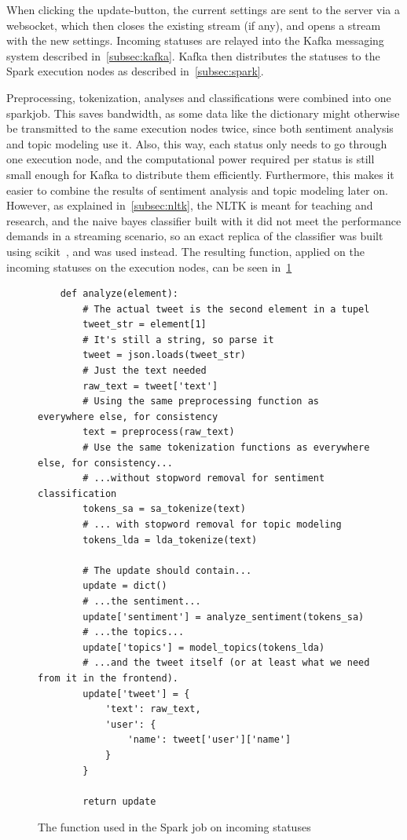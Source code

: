 When clicking the update-button, the current settings are sent to the server via a websocket,
which then closes the existing stream (if any), and opens a stream with the new settings.
Incoming statuses are relayed into the Kafka messaging system described in~\cref{subsec:kafka}.
Kafka then distributes the statuses to the Spark execution nodes as described in~\cref{subsec:spark}.

Preprocessing, tokenization, analyses and classifications were combined into one sparkjob.
This saves bandwidth, as some data like the dictionary might otherwise be transmitted to the same execution nodes twice,
since both sentiment analysis and topic modeling use it.
Also, this way, each status only needs to go through one execution node,
and the computational power required per status is still small enough for Kafka to distribute them efficiently.
Furthermore, this makes it easier to combine the results of sentiment analysis and topic modeling later on.
However, as explained in~\cref{subsec:nltk}, the NLTK is meant for teaching and research,
and the naive bayes classifier built with it did not meet the performance demands in a streaming scenario,
so an exact replica of the classifier was built using scikit~\cite{scikitDocs}, and was used instead.
The resulting function, applied on the incoming statuses on the execution nodes, can be seen in~\cref{fig:spark_job}

\begin{figure}
    \caption{The function used in the Spark job on incoming statuses}
    \label{fig:spark_job}
    \begin{verbatim}
    def analyze(element):
        # The actual tweet is the second element in a tupel
        tweet_str = element[1]
        # It's still a string, so parse it
        tweet = json.loads(tweet_str)
        # Just the text needed
        raw_text = tweet['text']
        # Using the same preprocessing function as everywhere else, for consistency
        text = preprocess(raw_text)
        # Use the same tokenization functions as everywhere else, for consistency...
        # ...without stopword removal for sentiment classification
        tokens_sa = sa_tokenize(text)
        # ... with stopword removal for topic modeling
        tokens_lda = lda_tokenize(text)

        # The update should contain...
        update = dict()
        # ...the sentiment...
        update['sentiment'] = analyze_sentiment(tokens_sa)
        # ...the topics...
        update['topics'] = model_topics(tokens_lda)
        # ...and the tweet itself (or at least what we need from it in the frontend).
        update['tweet'] = {
            'text': raw_text,
            'user': {
                'name': tweet['user']['name']
            }
        }

        return update
    \end{verbatim}
\end{figure}

